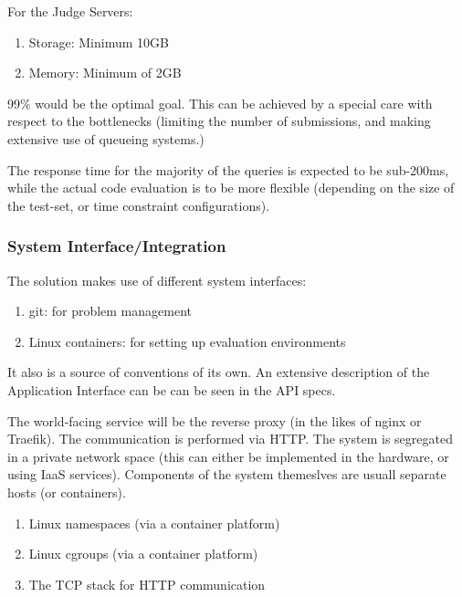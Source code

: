 \noindent
For the Judge Servers:
\begin{enumerate}
    \item Storage: Minimum 10GB
    \item Memory: Minimum of 2GB
\end{enumerate}


99\% would be the optimal goal. This can be achieved by a special care with respect to the bottlenecks (limiting the number of submissions,
and making extensive use of queueing systems.)


The response time for the majority of the queries is expected to be sub-200ms, while the actual
code evaluation is to be more flexible (depending on the size of the test-set, or time constraint configurations).

\subsubsection{System Interface/Integration}

The solution makes use of different system interfaces:
\begin{enumerate}
    \item{git}: for problem management
    \item{Linux containers}: for setting up evaluation environments
\end{enumerate}

It also is a source of conventions of its own. An extensive description of the Application Interface can be
can be seen in the API specs.


The world-facing service will be the reverse proxy (in the likes of nginx or Traefik). The communication is performed
via HTTP. The system is segregated in a private network space (this can either be implemented in the hardware, or 
using IaaS services). Components of the system themeslves are usuall separate hosts (or containers).


\begin{enumerate}
    \item Linux namespaces (via a container platform)
    \item Linux cgroups (via a container platform)
    \item The TCP stack for HTTP communication
\end{enumerate}

